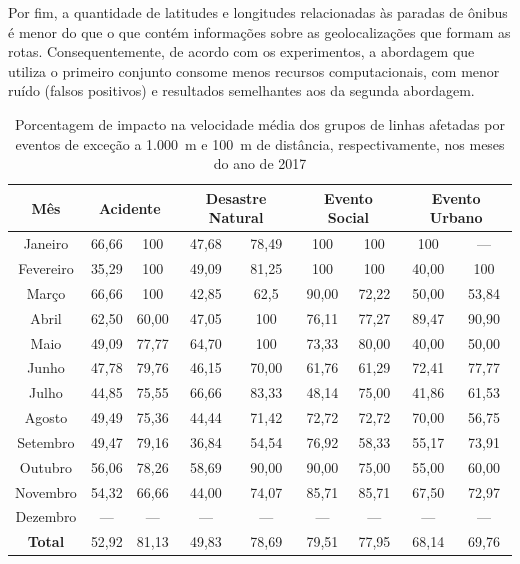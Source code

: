 \documentclass[
	12pt,				%
	oneside,			%
	a4paper,			%
	english,			%
	brazil				%
	]{abntex2ppgsi}
\begin{document}
{{{Por fim, a quantidade de latitudes e longitudes relacionadas às paradas de ônibus é menor do que o que contém informações sobre as geolocalizações que formam as rotas. Consequentemente, de acordo com os experimentos, a abordagem que utiliza o primeiro conjunto consome menos recursos computacionais, com menor ruído (falsos positivos) e resultados semelhantes aos da segunda abordagem. 

\begin{table}[!htb]
\centering
\caption {Porcentagem de impacto na velocidade média dos grupos de linhas afetadas por eventos de exceção a 1.000~m e 100~m de distância, respectivamente, nos meses do ano de 2017}
\label{tab:exceptEventVelocityImpAllShapes}
\begin{tabular}{c|cc|cc|cc|cc}
\toprule
\textbf{Mês} & \multicolumn{2}{c}{\textbf{Acidente}} & \multicolumn{2}{c}{\textbf{Desastre Natural}} & \multicolumn{2}{c}{\textbf{Evento Social}} &
\multicolumn{2}{c}{\textbf{Evento Urbano}}\\
\midrule
Janeiro & 66,66 &  100 & 
 47,68 &  78,49 & 
 100 & 100 &
 100 & --- \\
\hline
Fevereiro & 35,29  &  100 &
 49,09 &  81,25 &
 100 & 100 &
 40,00 & 100 \\
\hline
Março  & 66,66  &  100 & 
 42,85 &  62,5 &
90,00 & 72,22 &
50,00 & 53,84 \\
\hline
Abril & 62,50 & 60,00 & 
47,05  & 100 & 
76,11 & 77,27 & 
89,47 &  90,90\\
\hline
Maio & 49,09 &  77,77 &
64,70 &  100 &
73,33 & 80,00 &
40,00 & 50,00 \\
\hline
Junho & 47,78 &  79,76 &
 46,15 &  70,00 &
 61,76 & 61,29 &
72,41 & 77,77 \\
\hline
Julho & 44,85  &  75,55 &
 66,66  & 83,33 &
48,14  & 75,00 &
41,86 & 61,53 \\
\hline
Agosto & 49,49 & 75,36 &
  44,44 & 71,42 &
  72,72 & 72,72 & 
70,00  & 56,75 \\
\hline
Setembro & 49,47  & 79,16 &
36,84  & 54,54 &
76,92  & 58,33 & 
55,17 & 73,91 \\
\hline
Outubro & 56,06 & 78,26 &
58,69  & 90,00 &
90,00  & 75,00 &
55,00 & 60,00 \\
\hline
Novembro & 54,32 & 66,66 &
 44,00 & 74,07 &
85,71  & 85,71 &
67,50  & 72,97 \\
\hline
Dezembro & --- & --- & --- & --- & --- & --- & --- & ---  \\
\midrule
\midrule
\textbf{Total} & 52,92 & 81,13 & 49,83 & 78,69 & 79,51 & 77,95 & 68,14 & 69,76  \\
\bottomrule
\end{tabular}
\end{table}


}}}
\end{document}
